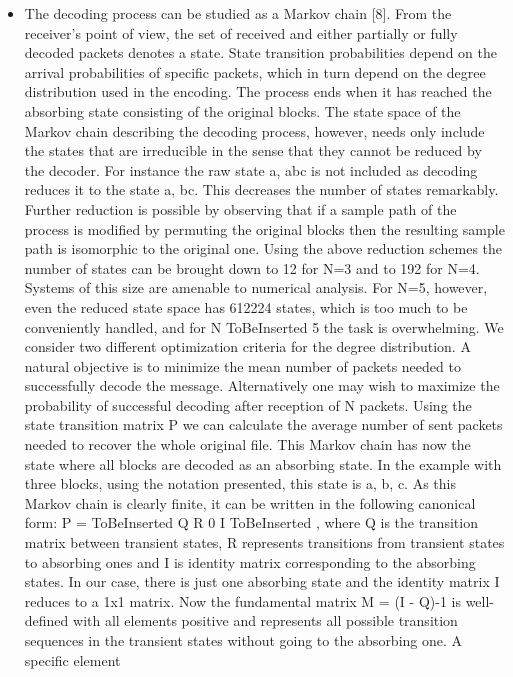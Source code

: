 \documentclass[12pt,a4paper,titlepage,twocolumn]{article}
\begin{document}
\begin{itemize}
  \item The decoding process can be studied as a Markov chain
[8]. From the receiver’s point of view, the set of received
and either partially or fully decoded packets denotes a state.
State transition probabilities depend on the arrival probabilities
of specific packets, which in turn depend on the degree
distribution used in the encoding. The process ends when it has
reached the absorbing state consisting of the original blocks.
The state space of the Markov chain describing the decoding
process, however, needs only include the states that are
irreducible in the sense that they cannot be reduced by the
decoder. For instance the raw state {a, abc} is not included
as decoding reduces it to the state {a, bc}. This decreases the
number of states remarkably. Further reduction is possible by
observing that if a sample path of the process is modified by
permuting the original blocks then the resulting sample path is
isomorphic to the original one. Using the above reduction schemes the number of states can
be brought down to 12 for N=3 and to 192 for N=4. Systems
of this size are amenable to numerical analysis. For N=5,
however, even the reduced state space has 612224 states, which
is too much to be conveniently handled, and for N ToBeInserted 5 the task
is overwhelming.
We consider two different optimization criteria for the degree
distribution. A natural objective is to minimize the mean
number of packets needed to successfully decode the message.
Alternatively one may wish to maximize the probability of
successful decoding after reception of N packets.
Using the state transition matrix P we can calculate the
average number of sent packets needed to recover the whole
original file. This Markov chain has now the state where all
blocks are decoded as an absorbing state. In the example with
three blocks, using the notation presented, this state is {a, b, c}.
As this Markov chain is clearly finite, it can be written in the
following canonical form:
P =
ToBeInserted
Q R
0 I
ToBeInserted
,
where Q is the transition matrix between transient states, R
represents transitions from transient states to absorbing ones
and I is identity matrix corresponding to the absorbing states.
In our case, there is just one absorbing state and the identity
matrix I reduces to a 1x1 matrix. Now the fundamental matrix
M = (I - Q)-1 is well-defined with all elements positive
and represents all possible transition sequences in the transient
states without going to the absorbing one. A specific element

\end{itemize}
\end{document}
